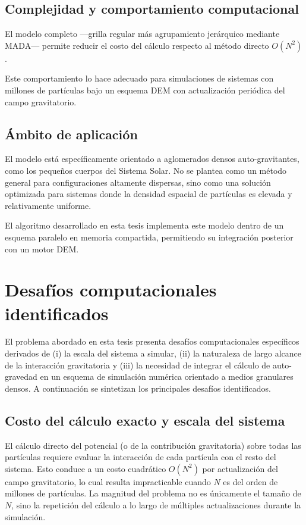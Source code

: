 \documentclass[a4paper,11pt]{book}
\begin{document}
\subsection{Complejidad y comportamiento computacional}

El modelo completo —grilla regular más agrupamiento jerárquico mediante MADA— permite reducir el costo del cálculo respecto al método directo $O(N^2)$.

Este comportamiento lo hace adecuado para simulaciones de sistemas con millones de partículas bajo un esquema DEM con actualización periódica del campo gravitatorio.

\subsection{Ámbito de aplicación}

El modelo está específicamente orientado a aglomerados densos auto-gravitantes, como los pequeños cuerpos del Sistema Solar. No se plantea como un método general para configuraciones altamente dispersas, sino como una solución optimizada para sistemas donde la densidad espacial de partículas es elevada y relativamente uniforme.

El algoritmo desarrollado en esta tesis implementa este modelo dentro de un esquema paralelo en memoria compartida, permitiendo su integración posterior con un motor DEM.


\section{Desafíos computacionales identificados}
\label{sec:desafios_computacionales}

El problema abordado en esta tesis presenta desafíos computacionales específicos derivados de (i) la escala del sistema a simular, (ii) la naturaleza de largo alcance de la interacción gravitatoria y (iii) la necesidad de integrar el cálculo de auto-gravedad en un esquema de simulación numérica orientado a medios granulares densos. A continuación se sintetizan los principales desafíos identificados.

\subsection{Costo del cálculo exacto y escala del sistema}

El cálculo directo del potencial (o de la contribución gravitatoria) sobre todas las partículas requiere evaluar la interacción de cada partícula con el resto del sistema. Esto conduce a un costo cuadrático $O(N^2)$ por actualización del campo gravitatorio, lo cual resulta impracticable cuando $N$ es del orden de millones de partículas. La magnitud del problema no es únicamente el tamaño de $N$, sino la repetición del cálculo a lo largo de múltiples actualizaciones durante la simulación.
\end{document}
